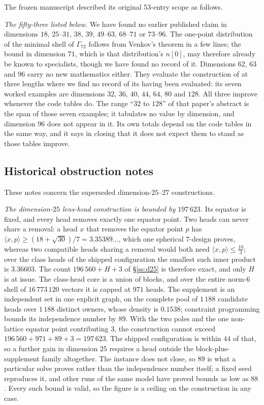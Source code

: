 \documentclass[11pt]{amsart}
\theoremstyle{remark}
\newcommand{\Gsz}{\Gamma_{72}}
\newcommand{\ip}[2]{\langle #1,#2\rangle}
\begin{document}
The frozen manuscript described its original 53-entry scope as follows.

\emph{The fifty-three listed below.} We have found no earlier published claim in dimensions
$18$, $25$--$31$, $38$, $39$, $49$--$63$, $68$--$71$ or $73$--$96$. The one-point
distribution of the minimal shell of $\Gsz$ follows from Venkov's theorem in a
few lines; the bound in dimension $71$, which is that distribution's $n[0]$, may therefore
already be known to specialists, though we have found no record of it. Dimensions $62$, $63$ and $96$
carry no new mathematics either. They evaluate the construction of
\cite{edel-rains-sloane1998} at three lengths where we find no record of its having
been evaluated: its seven worked examples are dimensions $32$, $36$, $40$, $44$,
$64$, $80$ and $128$. All three improve whenever the code tables do. The range
``$32$ to $128$'' of that paper's abstract is the span of those seven examples; it
tabulates no value by dimension, and dimension $96$ does not appear in it. Its own
totals depend on the code tables in the same way, and it says in closing that it
does not expect them to stand as those tables improve.


\subsection{Historical obstruction notes}

These notes concern the superseded dimension-$25$--$27$ constructions.

\emph{The dimension-$25$ lens-head construction is bounded by $197\,623$.}
Its equator is fixed, and every head removes exactly one equator point. Two
heads can never share a removal: a head $x$ that removes the equator point $p$
has $\ip{x}{p}\ge(18+\sqrt{30})/7=3.35389\ldots$, which one spherical $7$-design
proves, whereas two compatible heads sharing a removal would both need
$\ip{x}{p}\le\tfrac{10}{3}$; over the class heads of the shipped configuration
the smallest such inner product is $3.36603$. The count $196\,560+H+3$ of \S\ref{ss:d25} is
therefore exact, and only $H$ is at issue. The
class-head core is a union of blocks, and over the entire norm-$6$ shell of
$16\,773\,120$ vectors it is capped at $971$ heads. The supplement is an
independent set in one explicit graph, on the complete pool of $1\,188$
candidate heads over $1\,188$ distinct owners, whose density is $0.1538$;
constraint programming bounds its independence number by $89$. With the two
poles and the one non-lattice equator point contributing $3$, the construction
cannot exceed $196\,560+971+89+3=197\,623$. The shipped configuration is within
$44$ of that, so a further gain in dimension $25$ requires a head outside the
block-plus-supplement family altogether. The instance does not close, so $89$ is
what a particular solve proves rather than the independence number itself; a fixed
seed reproduces it, and other runs of the same model have proved bounds as low as
$88$. Every such bound is valid, so the figure is a ceiling on the construction in
any case.
\end{document}
